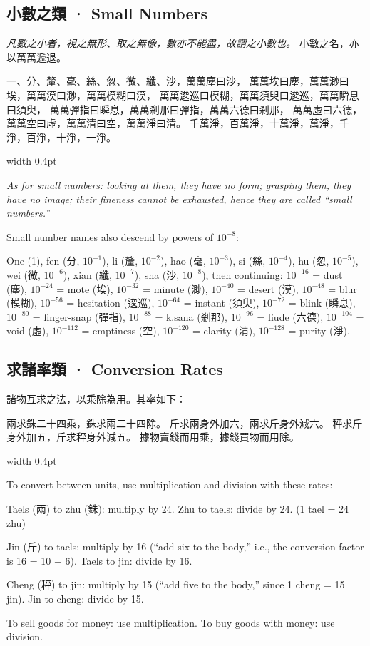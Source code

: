 \documentclass[10pt,a4paper]{article}
\newlength{\cnwidth}
\newlength{\enwidth}
\newcommand{\bilingual}[2]{%
  \noindent%
  \begin{minipage}[t]{\cnwidth}%
    #1%
  \end{minipage}%
  \hfill\vrule width 0.4pt\hfill%
  \begin{minipage}[t]{\enwidth}%
    #2%
  \end{minipage}%
  \par\smallskip%
}
\newcommand{\bilingualsubsection}[2]{%
  \subsection*{#1 · #2}
}
\begin{document}
\bilingualsubsection{小數之類}{Small Numbers}

\bilingual{%
  \textit{凡數之小者，視之無形、取之無像，數亦不能盡，故謂之小數也。}
  小數之名，亦以萬萬遞退。

  一、分、釐、毫、絲、忽、微、纖、沙，萬萬塵曰沙，
  萬萬埃曰塵，萬萬渺曰埃，萬萬漠曰渺，萬萬模糊曰漠，
  萬萬逡巡曰模糊，萬萬須臾曰逡巡，萬萬瞬息曰須臾，
  萬萬彈指曰瞬息，萬萬剎那曰彈指，萬萬六德曰剎那，
  萬萬虛曰六德，萬萬空曰虛，萬萬清曰空，萬萬淨曰清。
  千萬淨，百萬淨，十萬淨，萬淨，千淨，百淨，十淨，一淨。
}{%
  \textit{As for small numbers: looking at them, they have no form; grasping them, they have
  no image; their fineness cannot be exhausted, hence they are called ``small numbers.''}

  Small number names also descend by powers of $10^{-8}$:

  One (1), fen (分, $10^{-1}$), li (釐, $10^{-2}$), hao (毫, $10^{-3}$),
  si (絲, $10^{-4}$), hu (忽, $10^{-5}$), wei (微, $10^{-6}$),
  xian (纖, $10^{-7}$), sha (沙, $10^{-8}$), then continuing:
  $10^{-16}$ = dust (塵), $10^{-24}$ = mote (埃),
  $10^{-32}$ = minute (渺), $10^{-40}$ = desert (漠),
  $10^{-48}$ = blur (模糊), $10^{-56}$ = hesitation (逡巡),
  $10^{-64}$ = instant (須臾), $10^{-72}$ = blink (瞬息),
  $10^{-80}$ = finger-snap (彈指), $10^{-88}$ = k.sana (剎那),
  $10^{-96}$ = liude (六德), $10^{-104}$ = void (虛),
  $10^{-112}$ = emptiness (空), $10^{-120}$ = clarity (清),
  $10^{-128}$ = purity (淨).
}

\bilingualsubsection{求諸率類}{Conversion Rates}

\bilingual{%
  諸物互求之法，以乘除為用。其率如下：

  兩求銖二十四乘，銖求兩二十四除。
  斤求兩身外加六，兩求斤身外減六。
  秤求斤身外加五，斤求秤身外減五。
  據物賣錢而用乘，據錢買物而用除。
}{%
  To convert between units, use multiplication and division with these rates:

  Taels (兩) to zhu (銖): multiply by 24. Zhu to taels: divide by 24.
  (1 tael = 24 zhu)

  Jin (斤) to taels: multiply by 16 (``add six to the body,''
  i.e., the conversion factor is 16 = 10 + 6). Taels to jin: divide by 16.

  Cheng (秤) to jin: multiply by 15 (``add five to the body,''
  since 1 cheng = 15 jin). Jin to cheng: divide by 15.

  To sell goods for money: use multiplication.
  To buy goods with money: use division.
}
\end{document}
